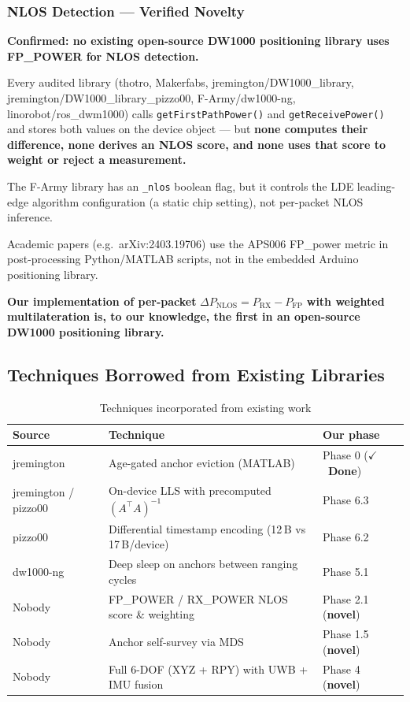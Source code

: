 \documentclass[11pt,a4paper]{article}
\newcommand{\done}{\texorpdfstring{\textcolor{dkgreen}{$\checkmark$~\textbf{Done}}}{[Done]}}
\begin{document}
\subsubsection{NLOS Detection --- Verified Novelty}

\begin{claimbox}
\textbf{Confirmed: no existing open-source DW1000 positioning library uses FP\_POWER for NLOS detection.}

Every audited library (thotro, Makerfabs, jremington/DW1000\_library, jremington/DW1000\_library\_pizzo00, F-Army/dw1000-ng, linorobot/ros\_dwm1000) calls \texttt{getFirstPathPower()} and \texttt{getReceivePower()} and stores both values on the device object --- but \textbf{none computes their difference, none derives an NLOS score, and none uses that score to weight or reject a measurement.}

The F-Army library has an \texttt{\_nlos} boolean flag, but it controls the LDE leading-edge algorithm configuration (a static chip setting), not per-packet NLOS inference.

Academic papers (e.g.\ arXiv:2403.19706) use the APS006 FP\_power metric in post-processing Python/MATLAB scripts, not in the embedded Arduino positioning library.

\textbf{Our implementation of per-packet} $\Delta P_\text{NLOS} = P_\text{RX} - P_\text{FP}$ \textbf{with weighted multilateration is, to our knowledge, the first in an open-source DW1000 positioning library.}
\end{claimbox}

\subsection{Techniques Borrowed from Existing Libraries}

\begin{table}[ht]
\centering
\caption{Techniques incorporated from existing work}
\begin{tabular}{lll}
\toprule
\textbf{Source} & \textbf{Technique} & \textbf{Our phase} \\
\midrule
jremington & Age-gated anchor eviction (MATLAB) & Phase 0 (\done) \\
jremington / pizzo00 & On-device LLS with precomputed $(A^\top A)^{-1}$ & Phase 6.3 \\
pizzo00 & Differential timestamp encoding (12\,B vs 17\,B/device) & Phase 6.2 \\
dw1000-ng & Deep sleep on anchors between ranging cycles & Phase 5.1 \\
Nobody & FP\_POWER / RX\_POWER NLOS score \& weighting & Phase 2.1 (\textbf{novel}) \\
Nobody & Anchor self-survey via MDS & Phase 1.5 (\textbf{novel}) \\
Nobody & Full 6-DOF (XYZ + RPY) with UWB + IMU fusion & Phase 4 (\textbf{novel}) \\
\bottomrule
\end{tabular}
\end{table}
\end{document}
